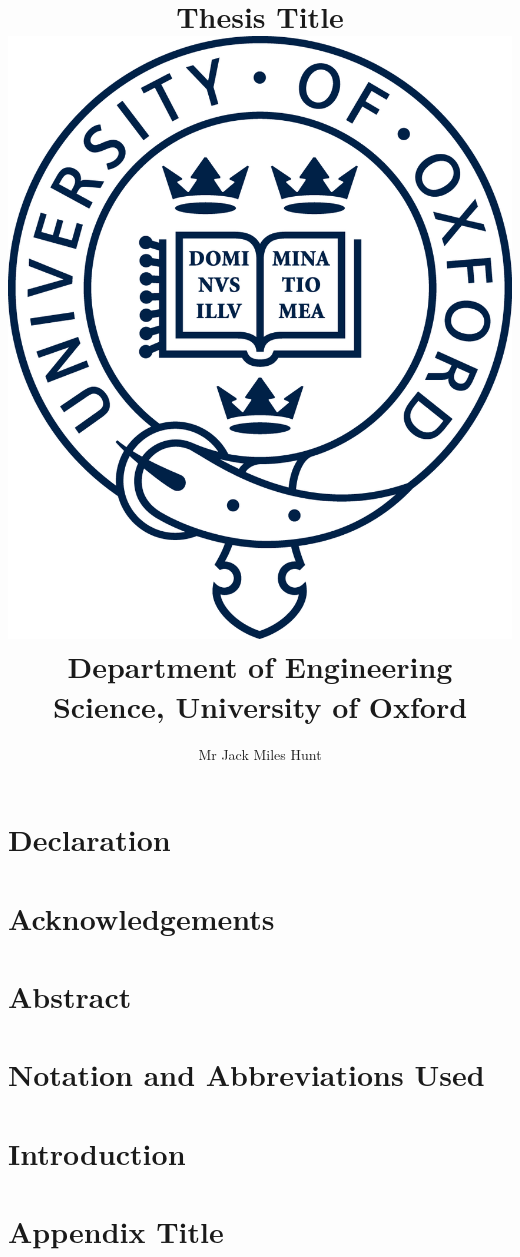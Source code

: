 \documentclass[12pt]{report}
\title{
    {Thesis Title}\\
    \vspace{10 mm}
    {\includegraphics[scale=1]{pre_chapters/figures/oxford_logo.png}\\
    {\large Department of Engineering Science, University of Oxford}\\}
}
\author{Mr Jack Miles Hunt}
\date{}
\begin{document}
\maketitle
\chapter*{Declaration}


\chapter*{Acknowledgements}


\chapter*{Abstract}


\chapter*{Notation and Abbreviations Used}


\tableofcontents
\chapter{Introduction}


\appendix
\chapter{Appendix Title}

\appendix


\end{document}
